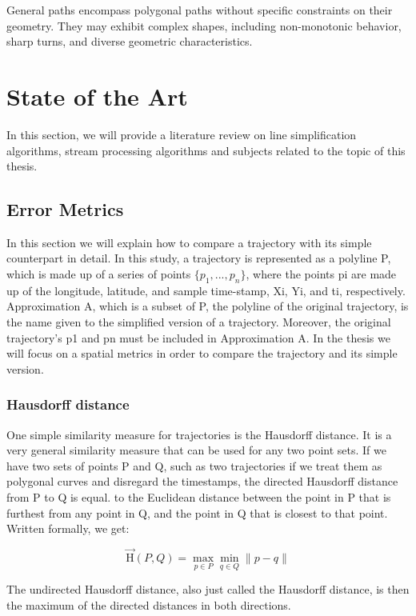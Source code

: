 \documentclass[twoside,12pt, a4paper]{report}
\begin{document}
General paths encompass polygonal paths without specific constraints on their geometry. They may exhibit complex shapes, including non-monotonic behavior, sharp turns, and diverse geometric characteristics.

\fi

\chapter{State of the Art}
In this section, we will provide a literature review on line simplification algorithms, stream processing algorithms and subjects related to the topic of this thesis.

\section{Error Metrics}
\cite{van2017extensive}
In this section we will explain how to compare a trajectory with its simple counterpart in detail. In this study, a trajectory is represented as a polyline P, which is made up of a series of points  $\{p_{1},..., p_{n}\}$, where the points pi are made up of the longitude, latitude, and sample time-stamp, Xi, Yi, and ti, respectively. Approximation A, which is a subset of P, the polyline of the original trajectory, is the name given to the simplified version of a trajectory. Moreover, the original trajectory's p1 and pn must be included in Approximation A. 
In the thesis we will focus on a spatial metrics in order to compare the trajectory and its simple version.  

\subsection{Hausdorff distance}

 \cite{kerkhof2022algorithmic} 
One simple similarity measure for trajectories is the Hausdorff distance. It is a very
general similarity measure that can be used for any two point sets. If we have two
sets of points P and Q, such as two trajectories if we treat them as polygonal curves
and disregard the timestamps, the directed Hausdorff distance from P to Q is equal.
to the Euclidean distance between the point in P that is furthest from any point in
Q, and the point in Q that is closest to that point. Written formally, we get:

$$\overrightarrow{\mathrm{H}}(P, Q)=\max _{p \in P} \min _{q \in Q} \| p-q \| $$

The undirected Hausdorff distance, also just called the Hausdorff distance, is then
the maximum of the directed distances in both directions.
\end{document}
